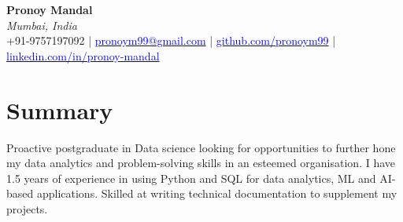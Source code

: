 \documentclass[a4paper,11pt]{article}
\makeatletter
\newcommand{\name}{Pronoy Mandal} %
\newcommand{\course}{Masters of Technology} %
\newcommand{\phone}{9757197092} %
\newcommand{\emaila}{pronoym99@gmail.com} %
\newcommand{\github}{https://github.com/pronoym99/} %
\newcommand{\linkedin}{https://www.linkedin.com/in/pronoy-mandal/} %
\makeatother
\begin{document}
\selectfont


\begin{center}
\textbf{\Huge \name} \\
\textit{Mumbai, India} \\
+91-9757197092 | \href{mailto:\emaila}{\textcolor{blue}{pronoym99@gmail.com}} | \href{https://github.com/\github}{\textcolor{blue}{github.com/pronoym99}} | \href{https://www.linkedin.com/in/\linkedin/}{\textcolor{blue}{linkedin.com/in/pronoy-mandal}}

\end{center}


  

\vspace{-2mm}
\section{\textbf{Summary}}

Proactive postgraduate in Data science looking for opportunities to further hone my data analytics and problem-solving skills in an esteemed organisation. I have 1.5 years of experience in using Python and SQL for data analytics, ML and AI-based applications. Skilled at writing technical documentation to supplement my projects.
\end{document}
